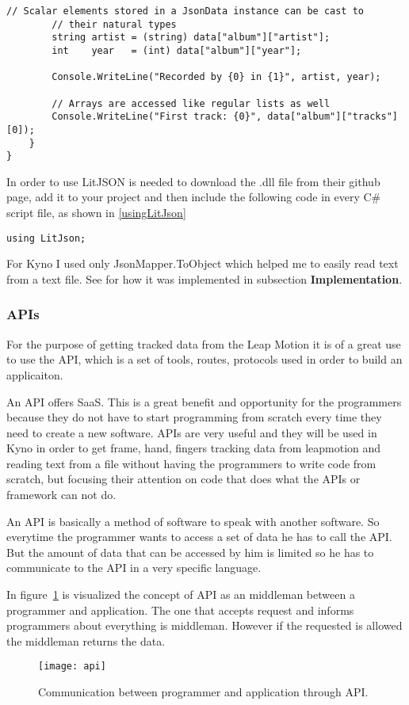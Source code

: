 {\begin{lstlisting}[caption={LitJson usage example in C\# \cite{lit}.},label={litjson}]
        // Scalar elements stored in a JsonData instance can be cast to
        // their natural types
        string artist = (string) data["album"]["artist"];
        int    year   = (int) data["album"]["year"];

        Console.WriteLine("Recorded by {0} in {1}", artist, year);

        // Arrays are accessed like regular lists as well
        Console.WriteLine("First track: {0}", data["album"]["tracks"][0]);
    }
}
\end{lstlisting}

In order to use LitJSON is needed to download the .dll file from their github page, add it to your project and then include the following code in every C\# script file, as shown in  \autoref{usingLitJson}
\begin{lstlisting}[caption={Using LitJSON as a json reader for your project.},label={usingLitJson}]
using LitJson;
\end{lstlisting}


For Kyno I used only JsonMapper.ToObject which helped me to easily read text from a text file. See for how it was implemented in subsection \textbf{Implementation}.

\subsubsection{APIs}
For the purpose of getting tracked data from the Leap Motion it is of a great use to use the API, which is a set of tools, routes, protocols used in order to build an applicaiton.

An API offers SaaS. This is a great benefit and opportunity for the programmers because they do not have to start programming from scratch every time they need to create a new software. APIs are very useful and they will be used in Kyno in order to get frame, hand, fingers tracking data from leapmotion and reading text from a file without having the programmers to write code from scratch, but focusing their attention on code that does what the APIs or framework can not do. 

An API is basically a method of software to speak with another software. So everytime the programmer wants to access a set of data he has to call the API. But the amount of data that can be accessed by him is limited so he has to communicate to the API in a very specific language.

In \mbox{figure \ref{api}} is visualized the concept of API as an middleman between a programmer and application. The one that accepts request and informs programmers about everything is middleman. However if the requested is allowed the middleman returns the data.
\begin{figure}[!h]
\centering
\texttt{[image: api]}
\caption{Communication between programmer and application through API. \cite{api}}\label{api}
\end{figure}

}
